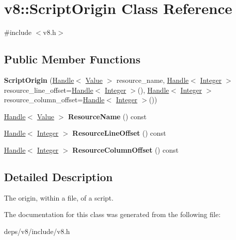 \hypertarget{classv8_1_1_script_origin}{}\section{v8\+:\+:Script\+Origin Class Reference}
\label{classv8_1_1_script_origin}


{\ttfamily \#include $<$v8.\+h$>$}

\subsection*{Public Member Functions}
\begin{DoxyCompactItemize}
\item 
\hypertarget{classv8_1_1_script_origin_a7b225aa16ea9ae42fd3179b23fb8388c}{}{\bfseries Script\+Origin} (\hyperlink{classv8_1_1_handle}{Handle}$<$ \hyperlink{classv8_1_1_value}{Value} $>$ resource\+\_\+name, \hyperlink{classv8_1_1_handle}{Handle}$<$ \hyperlink{classv8_1_1_integer}{Integer} $>$ resource\+\_\+line\+\_\+offset=\hyperlink{classv8_1_1_handle}{Handle}$<$ \hyperlink{classv8_1_1_integer}{Integer} $>$(), \hyperlink{classv8_1_1_handle}{Handle}$<$ \hyperlink{classv8_1_1_integer}{Integer} $>$ resource\+\_\+column\+\_\+offset=\hyperlink{classv8_1_1_handle}{Handle}$<$ \hyperlink{classv8_1_1_integer}{Integer} $>$())\label{classv8_1_1_script_origin_a7b225aa16ea9ae42fd3179b23fb8388c}

\item 
\hypertarget{classv8_1_1_script_origin_a289502d71720ca10e53b4a32d9226f58}{}\hyperlink{classv8_1_1_handle}{Handle}$<$ \hyperlink{classv8_1_1_value}{Value} $>$ {\bfseries Resource\+Name} () const \label{classv8_1_1_script_origin_a289502d71720ca10e53b4a32d9226f58}

\item 
\hypertarget{classv8_1_1_script_origin_a0735178b8afef9169a3481cf6cd7c557}{}\hyperlink{classv8_1_1_handle}{Handle}$<$ \hyperlink{classv8_1_1_integer}{Integer} $>$ {\bfseries Resource\+Line\+Offset} () const \label{classv8_1_1_script_origin_a0735178b8afef9169a3481cf6cd7c557}

\item 
\hypertarget{classv8_1_1_script_origin_a6d1b4cb1be2b6589151a029974cd1a60}{}\hyperlink{classv8_1_1_handle}{Handle}$<$ \hyperlink{classv8_1_1_integer}{Integer} $>$ {\bfseries Resource\+Column\+Offset} () const \label{classv8_1_1_script_origin_a6d1b4cb1be2b6589151a029974cd1a60}

\end{DoxyCompactItemize}


\subsection{Detailed Description}
The origin, within a file, of a script. 

The documentation for this class was generated from the following file\+:\begin{DoxyCompactItemize}
\item 
deps/v8/include/v8.\+h\end{DoxyCompactItemize}
